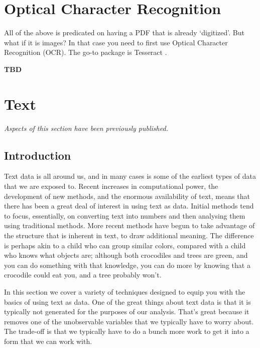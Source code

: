 \documentclass[
]{book}
\begin{document}
\hypertarget{optical-character-recognition}{%
\section{Optical Character Recognition}\label{optical-character-recognition}}

All of the above is predicated on having a PDF that is already `digitized'. But what if it is images? In that case you need to first use Optical Character Recognition (OCR). The go-to package is Tesseract \citet{citetesseract}.

\textbf{TBD}

\hypertarget{text}{%
\section{Text}\label{text}}

\emph{Aspects of this section have been previously published.}

\hypertarget{introduction-13}{%
\subsection{Introduction}\label{introduction-13}}

Text data is all around us, and in many cases is some of the earliest types of data that we are exposed to. Recent increases in computational power, the development of new methods, and the enormous availability of text, means that there has been a great deal of interest in using text as data. Initial methods tend to focus, essentially, on converting text into numbers and then analysing them using traditional methods. More recent methods have begun to take advantage of the structure that is inherent in text, to draw additional meaning. The difference is perhaps akin to a child who can group similar colors, compared with a child who knows what objects are; although both crocodiles and trees are green, and you can do something with that knowledge, you can do more by knowing that a crocodile could eat you, and a tree probably won't.

In this section we cover a variety of techniques designed to equip you with the basics of using text as data. One of the great things about text data is that it is typically not generated for the purposes of our analysis. That's great because it removes one of the unobservable variables that we typically have to worry about. The trade-off is that we typically have to do a bunch more work to get it into a form that we can work with.
\end{document}
